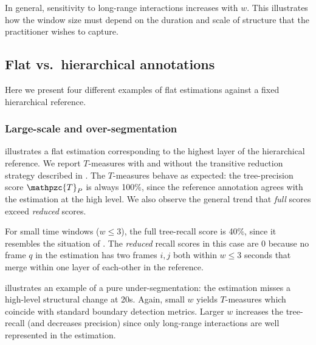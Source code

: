 \documentclass{article}
\def\shag{\ensuremath{\mathpzc{T}}}
\begin{document}
In general, sensitivity to long-range interactions increases with $w$.
This illustrates how the window size must depend on the duration and scale of structure
that the practitioner wishes to capture.

\subsection{Flat vs.\ hierarchical annotations}

Here we present four different examples of flat estimations against a fixed hierarchical reference.

\subsubsection{Large-scale and over-segmentation}
\label{sec:largeover}

 illustrates a flat estimation corresponding to the highest layer of the hierarchical reference.
We report $T$-measures with and without the transitive reduction strategy described in
.  The $T$-measures behave as expected: the tree-precision score
$\shag_P$ is always 100\%, since the reference annotation agrees with the estimation at
the high level.  We also observe the general trend that \emph{full} scores exceed 
\emph{reduced} scores.

For small time windows ($w \leq 3$), the full tree-recall score is 40\%, since it
resembles the situation of .
The \emph{reduced} recall scores in this case are 0 because no frame $q$ in the
estimation has two frames $i, j$ both within $w \leq 3$ seconds that merge within one layer of each-other in the reference. 


 illustrates an example of a pure under-segmentation: the estimation misses a high-level structural change at 20s.  
Again, small $w$ yields $T$-measures which coincide with standard boundary detection metrics.
Larger $w$ increases the tree-recall (and decreases precision)
since only long-range interactions are well represented in the estimation.
\end{document}
